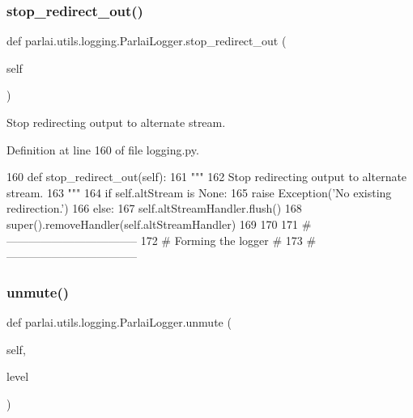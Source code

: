 \subsubsection{\texorpdfstring{stop\+\_\+redirect\+\_\+out()}{stop\_redirect\_out()}}
{\footnotesize\ttfamily def parlai.\+utils.\+logging.\+Parlai\+Logger.\+stop\+\_\+redirect\+\_\+out (\begin{DoxyParamCaption}\item[{}]{self }\end{DoxyParamCaption})}

\begin{DoxyVerb}Stop redirecting output to alternate stream.
\end{DoxyVerb}
 

Definition at line 160 of file logging.\+py.


\begin{DoxyCode}
160     \textcolor{keyword}{def }stop\_redirect\_out(self):
161         \textcolor{stringliteral}{"""}
162 \textcolor{stringliteral}{        Stop redirecting output to alternate stream.}
163 \textcolor{stringliteral}{        """}
164         \textcolor{keywordflow}{if} self.altStream \textcolor{keywordflow}{is} \textcolor{keywordtype}{None}:
165             \textcolor{keywordflow}{raise} Exception(\textcolor{stringliteral}{'No existing redirection.'})
166         \textcolor{keywordflow}{else}:
167             self.altStreamHandler.flush()
168             super().removeHandler(self.altStreamHandler)
169 
170 
171 \textcolor{comment}{# -----------------------------------}
172 \textcolor{comment}{# Forming the logger                #}
173 \textcolor{comment}{# -----------------------------------}
\end{DoxyCode}
\mbox{\label{classparlai_1_1utils_1_1logging_1_1ParlaiLogger_ad00121b486f8553c45d9ab13e81567ab}} 
\subsubsection{\texorpdfstring{unmute()}{unmute()}}
{\footnotesize\ttfamily def parlai.\+utils.\+logging.\+Parlai\+Logger.\+unmute (\begin{DoxyParamCaption}\item[{}]{self,  }\item[{}]{level }\end{DoxyParamCaption})}

